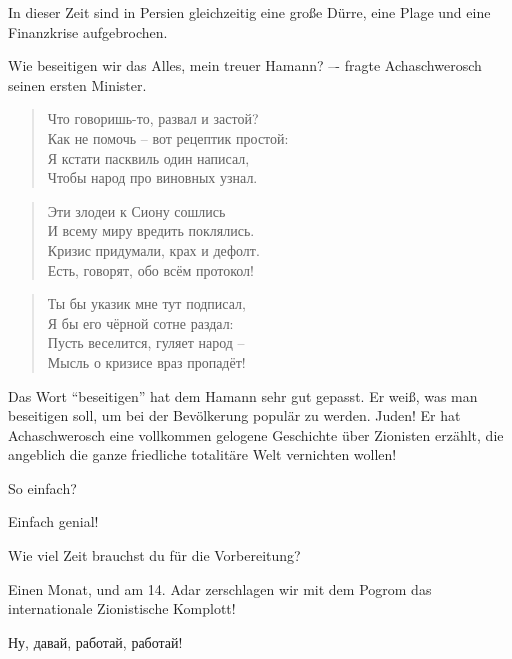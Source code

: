 \documentclass[12pt,a4paper,titlepage]{article}
\begin{document}
\begin{drama}
\uespeaks
In dieser Zeit sind in Persien gleichzeitig eine große Dürre,
eine Plage und eine Finanzkrise aufgebrochen.

Wie beseitigen wir das Alles, mein treuer Hamann?
–- fragte Achaschwerosch seinen ersten Minister.

\amspeaks {}
\begin{verse}
Что говоришь-то, развал и застой?\\
Как не помочь -- вот рецептик простой:\\
Я кстати пасквиль один написал,\\
Чтобы народ про виновных узнал.\\
\end{verse}

\begin{verse}
Эти злодеи к Сиону сошлись\\
И всему миру вредить поклялись.\\
Кризис придумали, крах и дефолт.\\
Есть, говорят, обо всём протокол!\\
\end{verse}

\begin{verse}
Ты бы указик мне тут подписал,\\
Я бы его чёрной сотне раздал:\\
Пусть веселится, гуляет народ --\\
Мысль о кризисе враз пропадёт!\\
\end{verse}


\uespeaks
Das Wort "`beseitigen"' hat dem Hamann sehr gut gepasst. Er weiß,
was man beseitigen soll, um bei der Bevölkerung populär zu werden.
Juden! Er hat Achaschwerosch eine vollkommen gelogene Geschichte
über Zionisten erzählt, die angeblich die ganze friedliche totalitäre Welt
vernichten wollen!

\ahspeaks
So einfach?

\amspeaks
Einfach genial!

\ahspeaks
Wie viel Zeit brauchst du für die Vorbereitung?

\amspeaks
Einen Monat, und am 14. Adar zerschlagen wir mit dem Pogrom
das internationale Zionistische Komplott!


\ahspeaks {}
Ну, давай, работай, работай!



\end{drama}
\end{document}
